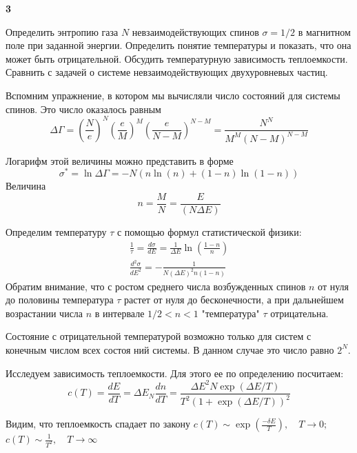 \documentclass[a4paper,12pt]{article} %
\begin{document}
\begin{ttask} \textbf{3}

Определить энтропию газа $ N $ невзаимодействующих спинов  $\sigma= 1/2$ в магнитном поле при заданной энергии. 
Определить понятие температуры и показать, что она может быть отрицательной. 
Обсудить температурную зависимость теплоемкости. 
Сравнить с задачей о системе невзаимодействующих двухуровневых частиц.


Вспомним упражнение, в котором мы вычисляли число состояний для системы спинов. Это число оказалось равным
$$
\Delta \Gamma=\left(\frac{N}{e}\right)^{N}\left(\frac{e}{M}\right)^{M}\left(\frac{e}{N-M}\right)^{N-M}=\frac{N^{N}}{M^{M}(N-M)^{N-M}}
$$

Логарифм этой величины можно представить в форме
$$
\sigma^{*}=\ln \Delta \Gamma=-N(n \ln (n)+(1-n) \ln (1-n))
$$
Величина
$$
n=\frac{M}{N}=\frac{E}{(N \Delta E)}
$$

Определим температуру $\tau$  с помощью формул статистической физики:
$$
\begin{array}{l}
\frac{1}{\tau}=\frac{d \sigma}{d E}=\frac{1}{\Delta E} \ln \left(\frac{1-n}{n}\right) \\
\frac{d^{2} \sigma}{d E^{2}}=-\frac{1}{N(\Delta E)^{2} n(1-n)}
\end{array}
$$
Обратим внимание, что с ростом среднего числа возбужденных спинов $n$ от нуля до половины температура $\tau$ растет от нуля до бесконечности, а при дальнейшем возрастании числа $n$ в интервале $1 / 2<n<1$ "температура" $\tau$ отрицательна. 

Состояние с отрицательной температурой возможно только для систем с конечным числом всех состоя ний системы. 
В данном случае это число равно $2^{N}$.


Исследуем зависимость теплоемкости. Для этого ее по определению посчитаем:
\[ c(T)=\frac{d E}{d T}=\Delta E_{N} \frac{d n}{d T}= \frac{\Delta E^{2} N \exp (\Delta E /T)}{T^{2}(1+\exp(\Delta E / T))^{2}} \]

Видим, что теплоемкость спадает по закону $ c(T) \sim \operatorname{exp}\left(\frac{-\delta E}{T}\right), \quad T \rightarrow 0;$ $c(T) \sim \frac{1}{T^{2}}, \quad T \rightarrow \infty$


\end{ttask}
\end{document}
